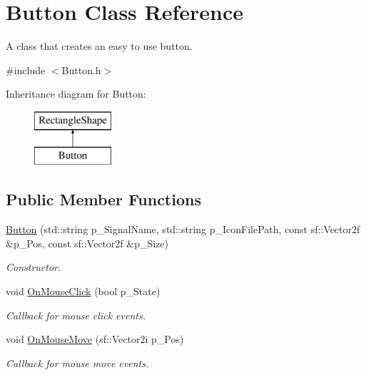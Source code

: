 \hypertarget{class_button}{}\section{Button Class Reference}
\label{class_button}


A class that creates an easy to use button.  




{\ttfamily \#include $<$Button.\+h$>$}

Inheritance diagram for Button\+:\begin{figure}[H]
\begin{center}
\leavevmode
\includegraphics[height=2.000000cm]{class_button}
\end{center}
\end{figure}
\subsection*{Public Member Functions}
\begin{DoxyCompactItemize}
\item 
\mbox{\label{class_button_ab1efa067f59ac17af501ba523527cee6}} 
\hyperlink{class_button_ab1efa067f59ac17af501ba523527cee6}{Button} (std\+::string p\+\_\+\+Signal\+Name, std\+::string p\+\_\+\+Icon\+File\+Path, const sf\+::\+Vector2f \&p\+\_\+\+Pos, const sf\+::\+Vector2f \&p\+\_\+\+Size)
\begin{DoxyCompactList}\small\item\em Constructor. \end{DoxyCompactList}\item 
\mbox{\label{class_button_acf51cb6628e0a1fd57d07201634ca859}} 
void \hyperlink{class_button_acf51cb6628e0a1fd57d07201634ca859}{On\+Mouse\+Click} (bool p\+\_\+\+State)
\begin{DoxyCompactList}\small\item\em Callback for mouse click events. \end{DoxyCompactList}\item 
\mbox{\label{class_button_a542274c2ff280252d8694e62d269da40}} 
void \hyperlink{class_button_a542274c2ff280252d8694e62d269da40}{On\+Mouse\+Move} (sf\+::\+Vector2i p\+\_\+\+Pos)
\begin{DoxyCompactList}\small\item\em Callback for mouse move events. \end{DoxyCompactList}\end{DoxyCompactItemize}

